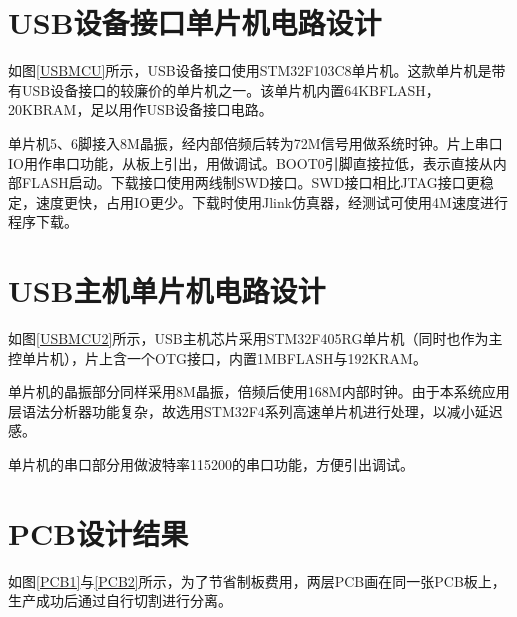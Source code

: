 \section{USB设备接口单片机电路设计}

如图\ref{USBMCU}所示，USB设备接口使用STM32F103C8单片机。这款单片机是带有USB设备接口的较廉价的单片机之一。该单片机内置64KBFLASH，20KBRAM，足以用作USB设备接口电路。

单片机5、6脚接入8M晶振，经内部倍频后转为72M信号用做系统时钟。片上串口IO用作串口功能，从板上引出，用做调试。BOOT0引脚直接拉低，表示直接从内部FLASH启动。下载接口使用两线制SWD接口。SWD接口相比JTAG接口更稳定，速度更快，占用IO更少。下载时使用Jlink仿真器，经测试可使用4M速度进行程序下载。

\section{USB主机单片机电路设计}


如图\ref{USBMCU2}所示，USB主机芯片采用STM32F405RG单片机（同时也作为主控单片机），片上含一个OTG接口，内置1MBFLASH与192KRAM。

单片机的晶振部分同样采用8M晶振，倍频后使用168M内部时钟。由于本系统应用层语法分析器功能复杂，故选用STM32F4系列高速单片机进行处理，以减小延迟感。

单片机的串口部分用做波特率115200的串口功能，方便引出调试。


\section{PCB设计结果}
如图\ref{PCB1}与\ref{PCB2}所示，为了节省制板费用，两层PCB画在同一张PCB板上，生产成功后通过自行切割进行分离。



